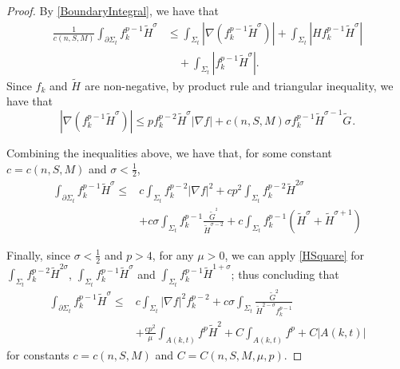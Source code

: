 \begin{proof}
    By \autoref{BoundaryIntegral}, we have that 
    \begin{equation*}
    \begin{split}
        \frac{1}{c(n,S,M)}\int_{\partial \Sigma_t} f_{k}^{p-1} \tilde{H}^{\sigma }  &\leq \int_{\Sigma_t} \left| \nabla \left( f_{k}^{p-1} \tilde{H}^{\sigma }  \right)  \right| + \int_{\Sigma_t} \left| H f_{k}^{p-1} \tilde{H}^{\sigma } \right|\\ 
        & \quad + \int_{\Sigma_t} \left| f_{k}^{p-1} \tilde{H}^{\sigma } \right|. 
    \end{split}
    \end{equation*} 
    Since $f_{k}^{} $ and $\tilde{H}^{} $ are non-negative, by product rule and triangular inequality, we have that
    \[
        \left| \nabla \left( f_{k}^{p-1} \tilde{H}^{\sigma }  \right)  \right| \leq p f_{k}^{p-2} \tilde{H}^{\sigma } \left| \nabla f \right| +c(n,S,M) \sigma f_{k}^{p-1} \tilde{H}^{\sigma -1} \tilde{G}^{} .
    \]

    Combining the inequalities above, we have that, for some constant $c=c(n,S,M)$ and $\sigma < \frac{1}{2}$,
    \begin{equation*}
    \begin{split}
        \int_{\partial \Sigma_t} f_{k}^{p-1} \tilde{H}^{\sigma }  
    \leq &c \int_{\Sigma_t} f_{k}^{p-2} \left| \nabla f \right| ^2 +cp^2 \int_{\Sigma_t} 
    f_{k}^{p-2} \tilde{H}^{2 \sigma } \\
    &+c \sigma \int_{\Sigma_t} f_{k}^{p-1} \frac{\tilde{G}^{^2} }{\tilde{H}^{\sigma -2} }+c \int_{\Sigma_t} f_{k}^{p-1} \left( \tilde{H}^{\sigma } +\tilde{H}^{\sigma +1}  \right) 
    \end{split}
    \end{equation*} 

    Finally, since $\sigma < \frac{1}{2}$ and $p>4$, for any $\mu >0$, we can apply \autoref{HSquare} for $\int_{\Sigma_t} f_{k}^{p-2} \tilde{H}^{2 \sigma }  $, $\int_{\Sigma_t} f_{k}^{p-1} \tilde{H}^{ \sigma }  $ and $\int_{\Sigma_t} f_{k}^{p-1} \tilde{H}^{1+ \sigma }  $; thus concluding that
    \begin{equation*}
        \begin{split}
            \int_{\partial \Sigma_t} f_{k}^{p-1}\tilde{H}^{\sigma } 
        \leq & c \int_{\Sigma_t} \left| \nabla f \right| ^2 f_{k}^{p-2} +c \sigma \int_{\Sigma_t} \frac{\tilde{G}^{2} }{\tilde{H}^{2-\sigma } f_{k}^{p-1} } \\
        &+ \frac{cp^2}{\mu }\int_{A(k,t)}^{}f^p \tilde{H}^{2} + C \int_{A(k,t)}^{}f^p + C \left| A(k,t) \right|
        \end{split}
        \end{equation*}
        for constants $c=c(n,S,M)$ and $C=C(n,S,M,\mu ,p)$.
\end{proof}

